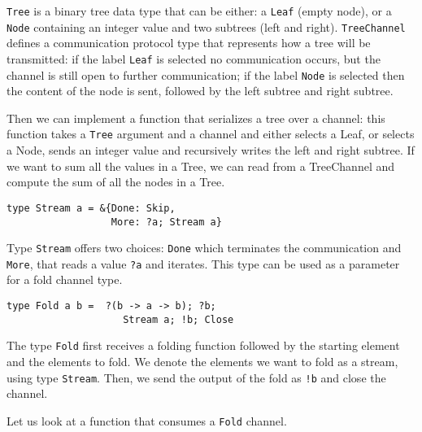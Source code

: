 \lstinline{Tree} is a binary tree data type that can be either: a \lstinline{Leaf} (empty node), or a \lstinline{Node} containing an integer value and two subtrees (left and right). \lstinline{TreeChannel} defines a communication protocol type that represents how a tree will be transmitted: if the label \lstinline{Leaf} is selected no communication occurs, but the channel is still open to further communication; if the label \lstinline{Node} is selected then the content of the node is sent, followed by the left subtree and right subtree. 

Then we can implement a function that serializes a tree over a channel: this function takes a \lstinline{Tree} argument and a channel and either selects a Leaf, or selects a Node, sends an integer value and recursively writes the left and right subtree. If we want to sum all the values in a Tree, we can read from a TreeChannel and compute the sum of all the nodes in a Tree. 



\begin{lstlisting}
type Stream a = &{Done: Skip, 
                  More: ?a; Stream a}
\end{lstlisting}

Type \lstinline|Stream| offers two choices: \lstinline|Done| which terminates the communication and \lstinline|More|, that reads a value \lstinline|?a| and iterates.
This type can be used as a parameter for a fold channel type.

\begin{lstlisting}
type Fold a b =  ?(b -> a -> b); ?b;
                    Stream a; !b; Close
\end{lstlisting}
\vspace{3mm}

The type \lstinline|Fold| first receives a folding function followed by the starting element and the elements to fold. We denote the elements we want to fold as a stream, using type \lstinline|Stream|. Then, we send the output of the fold as \lstinline|!b| and close the channel.

Let us look at a function that consumes a \lstinline|Fold| channel.

